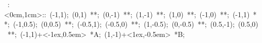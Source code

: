 \hbox{
\xy    <1cm,0cm>:<0cm,1cm>::
       (-1,1); (0,1) **\dir{-};
       (0,-1) **\dir{-}; (1,-1) **\dir{-}; (1,0) **\dir{-};
       (-1,0) **\dir{-}; (-1,1) **\dir{-}; 
       (-1,0.5); (0,0.5) **\dir{-};
       (-0.5,1); (-0.5,0) **\dir{-};
       (1,-0.5); (0,-0.5) **\dir{-};
       (0.5,-1); (0.5,0) **\dir{-};
       (-1,1)+<-1ex,0.5em> *{A};
       (1,-1)+<1ex,-0.5em> *{B};
\endxy}
